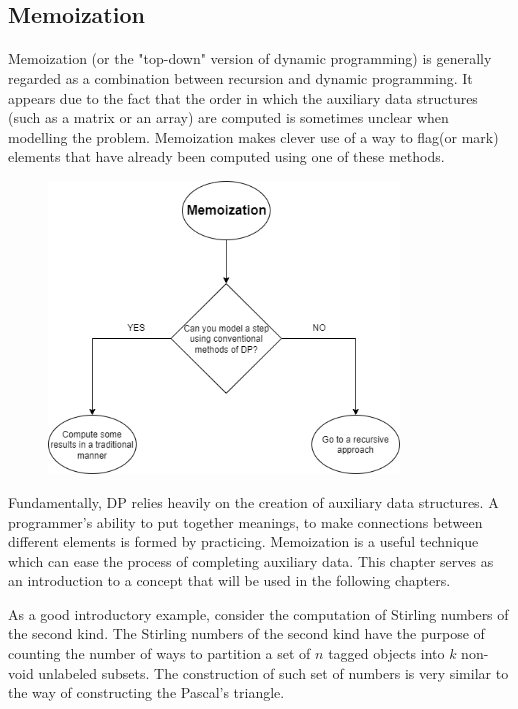 \documentclass[letterpaper]{article}
\begin{document}
\newpage

\subsection{Memoization}

\paragraph{}

Memoization (or the "top-down" version of dynamic programming) is generally regarded as a combination between recursion and dynamic programming. It appears due to the fact that the order in which the auxiliary data structures (such as a matrix or an array) are computed is sometimes unclear when modelling the problem. Memoization makes clever use of a way to flag(or mark) elements that have already been computed using one of these methods.

\begin{figure} [h!]
\centering
\includegraphics[width=0.83\textwidth]{pngOfDiagrams/memoization.png}
\end{figure}

Fundamentally, DP relies heavily on the creation of auxiliary data structures. A programmer's ability to put together meanings, to make connections between different elements is formed by practicing. Memoization is a useful technique which can ease the process of completing auxiliary data. This chapter serves as an introduction to a concept that will be used in the following chapters.

As a good introductory example, consider the computation of Stirling numbers of the second kind. The Stirling numbers of the second kind have the purpose of counting the number of ways to partition a set of $n$ tagged objects into $k$ non-void unlabeled subsets. The construction of such set of numbers is very similar to the way of constructing the Pascal's triangle.
\end{document}
